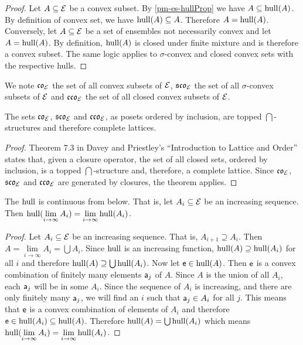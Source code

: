 \begin{mathSection}
\begin{proof}
	Let $A \subseteq \Ens$ be a convex subset. By \ref{pm-es-hullProp} we have $A \subseteq \hull(A)$. By definition of convex set, we have $\hull(A) \subseteq A$. Therefore $A = \hull(A)$. Conversely, let $A \subseteq \Ens$ be a set of ensembles not necessarily convex and let $A=\hull(A)$. By definition, $\hull(A)$ is closed under finite mixture and is therefore a convex subset. The same logic applies to $\sigma$-convex and closed convex sets with the respective hulls.
\end{proof}

\begin{defn}
	We note $\mathfrak{co}_{\Ens}$ the set of all convex subsets of $\Ens$, $\mathfrak{sco}_{\Ens}$ the set of all $\sigma$-convex subsets of $\Ens$ and $\mathfrak{cco}_{\Ens}$ the set of all closed convex subsets of $\Ens$.
\end{defn}

\begin{prop}
	The sets $\mathfrak{co}_{\Ens}$, $\mathfrak{sco}_{\Ens}$ and $\mathfrak{cco}_{\Ens}$, as posets ordered by inclusion, are topped $\bigcap$-structures and therefore complete lattices.
\end{prop}

\begin{proof}
	Theorem 7.3 in Davey and Priestley's ``Introduction to Lattice and Order'' states that, given a closure operator, the set of all closed sets, ordered by inclusion, is a topped $\bigcap$-structure and, therefore, a complete lattice. Since $\mathfrak{co}_{\Ens}$, $\mathfrak{sco}_{\Ens}$ and $\mathfrak{cco}_{\Ens}$ are generated by closures, the theorem applies.
\end{proof}

\begin{prop}
	The $\hull$ is continuous from below. That is, let $A_i \subseteq \Ens$ be an increasing sequence. Then $\hull(\lim\limits_{i \to \infty} A_i) = \lim\limits_{i \to \infty} \hull(A_i)$.
\end{prop}

\begin{proof}
	Let $A_i \subseteq \Ens$ be an increasing sequence. That is, $A_{i+1} \supseteq A_i$. Then $A = \lim\limits_{i \to \infty} A_i = \bigcup A_i$. Since $\hull$ is an increasing function, $\hull(A) \supseteq \hull(A_i)$ for all $i$ and therefore $\hull(A) \supseteq \bigcup \hull(A_i)$. Now let $\ens \in \hull(A)$. Then $\ens$ is a convex combination of finitely many elements $\ens[a]_j$ of $A$. Since $A$ is the union of all $A_i$, each $\ens[a]_j$ will be in some $A_i$. Since the sequence of $A_i$ is increasing, and there are only finitely many $\ens[a]_j$, we will find an $i$ such that $\ens[a]_j \in A_i$ for all $j$. This means that $\ens$ is a convex combination of elements of $A_i$ and therefore $\ens \in \hull(A_i) \subseteq \hull(A)$. Therefore $\hull(A) = \bigcup \hull(A_i)$ which means $\hull(\lim\limits_{i \to \infty} A_i) = \lim\limits_{i \to \infty} \hull(A_i)$.
\end{proof}



\end{mathSection}
